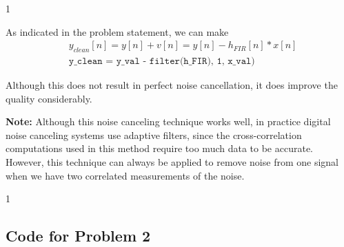 \documentclass[10pt]{article}
\def\SOLUTIONS{1} %
\def\SolutionsColor{red2}
\begin{document}
\begin{description}
	\if\SOLUTIONS1 {\color{\SolutionsColor} As indicated in the problem statement, we can make
		\begin{align*}
			&y_{clean}[n] = y[n] + v[n] = y[n] - h_{FIR}[n]\ast x[n] \\
			&\texttt{y\_clean = y\_val - filter(h\_FIR), 1, x\_val)}
		\end{align*}
		
		Although this does not result in perfect noise cancellation, it does improve the quality considerably.
	}\fi

\end{description}

\textbf{Note:} Although this noise canceling technique works well, in practice digital noise canceling systems use adaptive filters, since the cross-correlation computations used in this method require too much data to be accurate. However, this technique can always be applied to remove noise from one signal when we have two correlated measurements of the noise.

\if\SOLUTIONS1 
\subsection*{Code for Problem 2}

\fi
\end{document}
